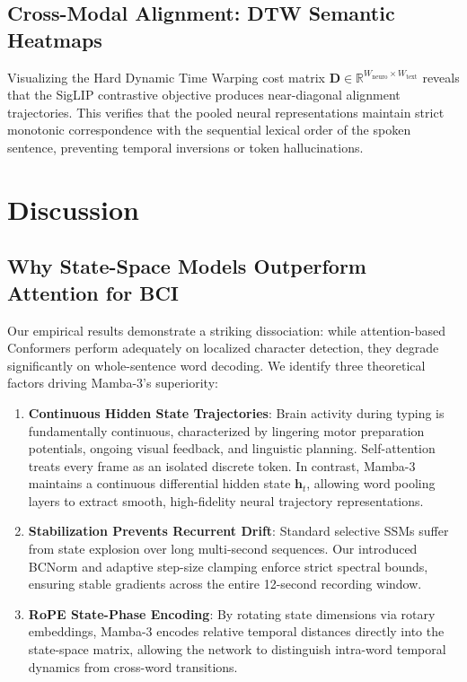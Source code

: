 \documentclass[conference]{IEEEtran}
\begin{document}
\subsection{Cross-Modal Alignment: DTW Semantic Heatmaps}
Visualizing the Hard Dynamic Time Warping cost matrix $\mathbf{D} \in \mathbb{R}^{W_{\text{neuro}} \times W_{\text{text}}}$ reveals that the SigLIP contrastive objective produces near-diagonal alignment trajectories. This verifies that the pooled neural representations maintain strict monotonic correspondence with the sequential lexical order of the spoken sentence, preventing temporal inversions or token hallucinations.

\section{Discussion}
\label{sec:discussion}

\subsection{Why State-Space Models Outperform Attention for BCI}
Our empirical results demonstrate a striking dissociation: while attention-based Conformers perform adequately on localized character detection, they degrade significantly on whole-sentence word decoding. We identify three theoretical factors driving Mamba-3's superiority:
\begin{enumerate}
    \item \textbf{Continuous Hidden State Trajectories}: Brain activity during typing is fundamentally continuous, characterized by lingering motor preparation potentials, ongoing visual feedback, and linguistic planning. Self-attention treats every frame as an isolated discrete token. In contrast, Mamba-3 maintains a continuous differential hidden state $\mathbf{h}_t$, allowing word pooling layers to extract smooth, high-fidelity neural trajectory representations.
    \item \textbf{Stabilization Prevents Recurrent Drift}: Standard selective SSMs suffer from state explosion over long multi-second sequences. Our introduced BCNorm and adaptive step-size clamping enforce strict spectral bounds, ensuring stable gradients across the entire 12-second recording window.
    \item \textbf{RoPE State-Phase Encoding}: By rotating state dimensions via rotary embeddings, Mamba-3 encodes relative temporal distances directly into the state-space matrix, allowing the network to distinguish intra-word temporal dynamics from cross-word transitions.
\end{enumerate}
\end{document}

